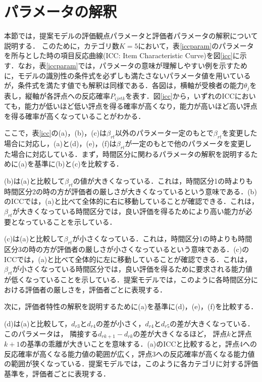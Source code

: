 \documentclass[a4paper,11pt,oneside,openany]{jsbook}
\begin{document}
\section{パラメータの解釈}
本節では，提案モデルの評価観点パラメータと評価者パラメータの解釈について説明する．
このために，カテゴリ数$K=5$において，表\ref{iccparam}のパラメータを所与とした時の項目反応曲線(ICC: Item Characteristic Curve)を図\ref{icc}に示す．なお，表\ref{iccparam}では，パラメータの意味が理解しやすい例を示すために，モデルの識別性の条件式を必ずしも満たさないパラメータ値を用いているが，条件式を満たす値でも解釈は同様である．各図は，横軸が受検者の能力$\theta_j$を表し，縦軸が各評点への反応確率$P_{ijrtk}$を表す．図\ref{icc}から，いずれのICCにおいても，能力が低いほど低い評点を得る確率が高くなり，能力が高いほど高い評点を得る確率が高くなっていることがわかる．

ここで，表\ref{icc}の(a)，(b)，(c)は$\beta_{rt}$以外のパラメータ一定のもとで$\beta_{rt}$を変更した場合に対応し，(a)と(d)，(e)，(f)は$\beta_{rt}$が一定のもとで他のパラメータを変更した場合に対応している．まず，時間区分に関わるパラメータの解釈を説明するために(a)を基準に(b)と(c)を比較する．

(b)は(a)と比較して$\beta_{rt}$の値が大きくなっている．これは，時間区分1の時よりも時間区分2の時の方が評価者の厳しさが大きくなっているという意味である．(b)のICCでは，(a)と比べて全体的に右に移動していることが確認できる．これは，$\beta_{rt}$が大きくなっている時間区分では，良い評価を得るためにより高い能力が必要となっていることを示している．

(c)は(a)と比較して$\beta_{rt}$が小さくなっている．これは，時間区分1の時よりも時間区分3の時の方が評価者の厳しさが小さくなっているという意味である．(c)のICCでは，(a)と比べて全体的に左に移動していることが確認できる．これは，$\beta_{rt}$が小さくなっている時間区分では，良い評価を得るために要求される能力値が低くなっていることを示している．提案モデルでは，このように各時間区分における評価者の厳しさを，評価者ごとに表現する．

次に，評価者特性の解釈を説明するために(a)を基準に(d)，(e)，(f)を比較する．

(d)は(a)と比較して，$d_{r3}$と$d_{r4}$の差が小さく，$d_{r4}$と$d_{r5}$の差が大きくなっている．このパラメータは， 隣接する$d_{rk+1} − d_{rk}$の差が大きくなるほど， 評点$k$と評点$k+1$の基準の乖離が大きいことを意味する．(a)のICCと比較すると，評点4への反応確率が高くなる能力値の範囲が広く，評点3への反応確率が高くなる能力値の範囲が狭くなっている．提案モデルでは，このように各カテゴリに対する評価基準を，評価者ごとに表現する．
\end{document}
